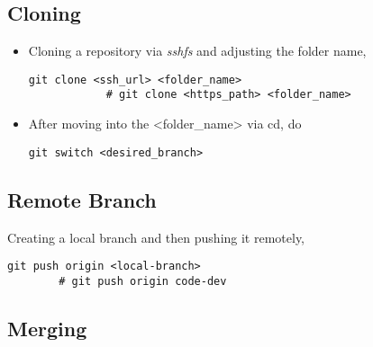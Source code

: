 \documentclass[12pt, a4paper]{article}
\numberwithin{equation}{section}
\theoremstyle{definition}
\theoremstyle{definition}
\begin{document}
	\subsection{Cloning}
	\begin{itemize}
		\item Cloning a repository via \textit{sshfs} and adjusting the folder name, 
		\begin{lstlisting}[style=mystylebash, label=alg:cloning1, xleftmargin=\parindent]
			git clone <ssh_url> <folder_name>
			# git clone <https_path> <folder_name>
		\end{lstlisting}
	
		\item After moving into the <folder_name> via cd, do 
		\begin{lstlisting}[style=mystylebash, label=alg:cloning3, xleftmargin=\parindent]
			git switch <desired_branch>
		\end{lstlisting}
	\end{itemize}

	\subsection{Remote Branch}

	Creating a local branch and then pushing it remotely,
	
	\begin{lstlisting}[style=mystylebash, xleftmargin=\parindent]
		git push origin <local-branch>
		# git push origin code-dev
	\end{lstlisting}
	
	\subsection{Merging}
	
\end{document}
